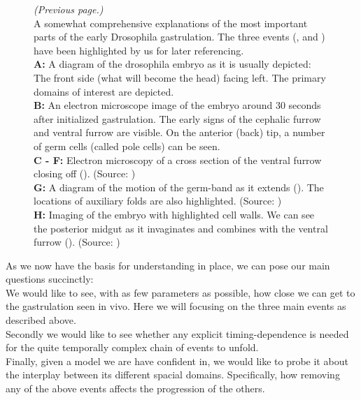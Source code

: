 \begin{figure} [t!]
  \caption{
      \textit{(Previous page.) }\\ 
      A somewhat comprehensive explanations of the most important parts of the early Drosophila gastrulation. The three events (,  and ) have been highlighted by us for later referencing.\\
      \textbf{A:} A diagram of the drosophila embryo as it is usually depicted: The front side (what will become the head) facing left. The primary domains of interest are depicted.\\
      \textbf{B:} An electron microscope image of the embryo around 30 seconds after initialized gastrulation. The early signs of the cephalic furrow and ventral furrow are visible. On the anterior (back) tip, a number of germ cells (called pole cells) can be seen.\\
      \textbf{C - F:} Electron microscopy of a cross section of the {ventral furrow} closing off (). (Source: )\\
      \textbf{G:} A diagram of the motion of the {germ-band} as it extends (). The locations of auxiliary folds are also highlighted. (Source: )\\
      \textbf{H:} Imaging of the embryo with highlighted cell walls. We can see the {posterior midgut} as it invaginates and combines with the ventral furrow (). (Source: )
  }

\end{figure}

As we now have the basis for understanding in place, we can pose our main questions succinctly:\\

We would like to see, with as few parameters as possible, how close we can get to the gastrulation seen in vivo. Here we will focusing on the three main events as described above.\\ Secondly we would like to see whether any explicit timing-dependence is needed for the quite temporally complex chain of events to unfold. \\ 
Finally, given a model we are have confident in, we would like to probe it about the interplay between its different spacial domains. Specifically, how removing any of the above events affects the progression of the others.


